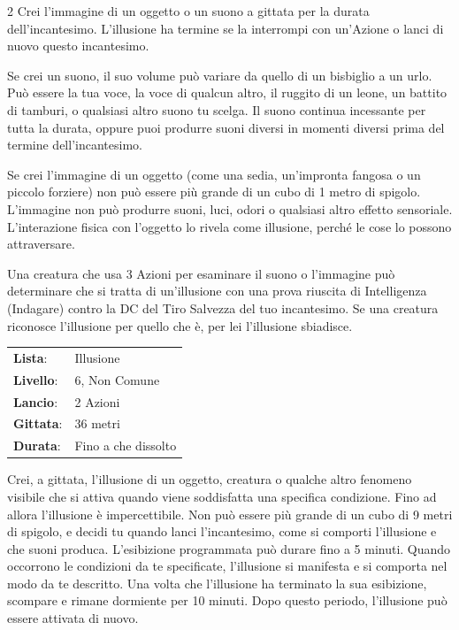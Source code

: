 \begin{multicols}{2}
Crei l'immagine di un oggetto o un suono a gittata per la durata dell'incantesimo. L'illusione ha termine se la interrompi con un'Azione o lanci di nuovo questo incantesimo.

Se crei un suono, il suo volume può variare da quello di un bisbiglio a un urlo. Può essere la tua voce, la voce di qualcun altro, il ruggito di un leone, un battito di tamburi, o qualsiasi altro suono tu scelga. Il suono continua incessante per tutta la durata, oppure puoi produrre suoni diversi in momenti diversi prima del termine dell'incantesimo.

Se crei l'immagine di un oggetto (come una sedia, un'impronta fangosa o un piccolo forziere) non può essere più grande di un cubo di 1 metro di spigolo. L'immagine non può produrre suoni, luci, odori o qualsiasi altro effetto sensoriale. L'interazione fisica con l'oggetto lo rivela come illusione, perché le cose lo possono attraversare.

Una creatura che usa 3 Azioni per esaminare il suono o l'immagine può determinare che si tratta di un'illusione con una prova riuscita di Intelligenza (Indagare) contro la DC del Tiro Salvezza del tuo incantesimo. Se una creatura riconosce l'illusione per quello che è, per lei l'illusione sbiadisce.

\noindent\begin{tabularx}{\linewidth}{p{1.9cm}X}
	\rowcolor{gray!20}\textbf{Lista}: & Illusione \\
	\textbf{Livello}: & 6, Non Comune \\
	\rowcolor{gray!20}\textbf{Lancio}: & 2 Azioni \\
	\textbf{Gittata}: & 36 metri \\
	\rowcolor{gray!20}\textbf{Durata}: & Fino a che dissolto \\
\end{tabularx}\smallskip

Crei, a gittata, l'illusione di un oggetto, creatura o qualche altro fenomeno visibile che si attiva quando viene soddisfatta una specifica condizione. Fino ad allora l'illusione è impercettibile. Non può essere più grande di un cubo di 9 metri di spigolo, e decidi tu quando lanci l'incantesimo, come si comporti l'illusione e che suoni produca. L'esibizione programmata può durare fino a 5 minuti. Quando occorrono le condizioni da te specificate, l'illusione si manifesta e si comporta nel modo da te descritto. Una volta che l'illusione ha terminato la sua esibizione, scompare e rimane dormiente per 10 minuti. Dopo questo periodo, l'illusione può essere attivata di nuovo.


\end{multicols}
